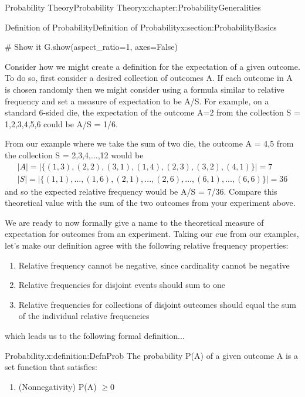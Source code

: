 \documentclass[oneside,10pt,]{book}
\numberwithin{equation}{section}
\begin{document}
\begin{chapterptx}{Probability Theory}{}{Probability Theory}{}{}{x:chapter:ProbabilityGeneralities}
\begin{sectionptx}{Definition of Probability}{}{Definition of Probability}{}{}{x:section:ProbabilityBasics}
\begin{sageinput}
    # Show it
    G.show(aspect_ratio=1, axes=False)
\end{sageinput}
Consider how we might create a definition for the expectation of a given outcome. To do so, first consider a desired collection of outcomes A. If each outcome in A is chosen randomly then we might consider using a formula similar to relative frequency and set a measure of expectation to be \textbar{}A\textbar{}\slash{}\textbar{}S\textbar{}. For example, on a standard 6-sided die, the expectation of the outcome A=\textbraceleft{}2\textbraceright{} from the collection S = \textbraceleft{}1,2,3,4,5,6\textbraceright{} could be \textbar{}A\textbar{}\slash{}\textbar{}S\textbar{} = 1\slash{}6.%
\par
From our example where we take the sum of two die, the outcome A = \textbraceleft{} 4,5 \textbraceright{} from the collection S = \textbraceleft{}2,3,4,...,12\textbraceright{} would be%
\begin{gather*}
|A| = | \{ (1,3),(2,2),(3,1),(1,4),(2,3),(3,2),(4,1) \}| = 7\\
|S| = | \{ (1,1),...,(1,6),(2,1),...,(2,6),...,(6,1),...,(6,6) \}| = 36
\end{gather*}
and so the expected relative frequency would be \textbar{}A\textbar{}\slash{}\textbar{}S\textbar{} = 7\slash{}36. Compare this theoretical value with the sum of the two outcomes from your experiment above.%
\par
We are ready to now formally give a name to the theoretical measure of expectation for outcomes from an experiment. Taking our cue from our examples, let's make our definition agree with the following relative frequency properties:%
\begin{enumerate}
\item{}Relative frequency cannot be negative, since cardinality cannot be negative%
\item{}Relative frequencies for disjoint events should sum to one%
\item{}Relative frequencies for collections of disjoint outcomes should equal the sum of the individual relative frequencies%
\end{enumerate}
%
\par
which leads us to the following formal definition...%
\begin{definition}{Probability.}{x:definition:DefnProb}%
The probability P(A) of a given outcome A is a set function that satisfies:%
\par
%
\begin{enumerate}
\item{}(Nonnegativity) P(A) \(\ge 0\)%

\end{enumerate}
\end{definition}
\end{sectionptx}
\end{chapterptx}
\end{document}

